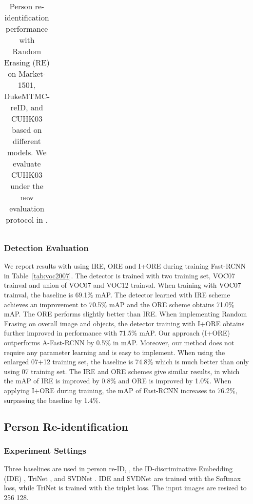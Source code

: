 \documentclass[10pt,twocolumn,letterpaper]{article}
\begin{document}
\begin{table*}
\begin{center}
\begin{tabularx}{\linewidth}{ l|c|c|CC|CC|CC|CC }
\end{tabularx}
\end{center}
\vspace{-.1in}
\caption{\label{tabel:reid} Person re-identification performance with Random Erasing (RE) on Market-1501, DukeMTMC-reID, and CUHK03 based on different models. We evaluate CUHK03 under the new evaluation protocol in \cite{zhong2017re}. }
\end{table*}


\subsubsection{Detection Evaluation}

We report results with using IRE, ORE and I+ORE during training Fast-RCNN in Table~\ref{tab:voc2007}. The detector is trained with two training set, VOC07 trainval and union of VOC07 and VOC12 trainval. When training with VOC07 trainval, the baseline is 69.1\% mAP. The detector learned with IRE scheme achieves an improvement to 70.5\% mAP and the ORE scheme obtains 71.0\% mAP. The ORE performs slightly better than IRE. When implementing Random Erasing on  overall image and objects, the detector training with I+ORE obtains further improved in performance with 71.5\% mAP. Our approach (I+ORE) outperforms A-Fast-RCNN \cite{A-fast-rcnn} by 0.5\% in mAP. Moreover, our method does not require any parameter learning and is easy to implement. When using the enlarged 07+12 training set, the baseline is 74.8\% which is much better than only using 07 training set. The IRE and ORE schemes give similar results, in which the mAP of IRE is improved by 0.8\% and ORE is improved by 1.0\%. When applying I+ORE during training, the mAP of Fast-RCNN increases to 76.2\%, surpassing the baseline by 1.4\%.




\subsection{Person Re-identification}



\subsubsection{Experiment Settings}
Three baselines are used in person re-ID, \ie, the ID-discriminative Embedding (IDE) \cite{reid-survey}, TriNet \cite{hermans2017defense}, and SVDNet \cite{sun2017svdnet}. IDE and SVDNet are trained with the Softmax loss, while TriNet is trained with the triplet loss. The input images are resized to 256  128. 
\end{document}
